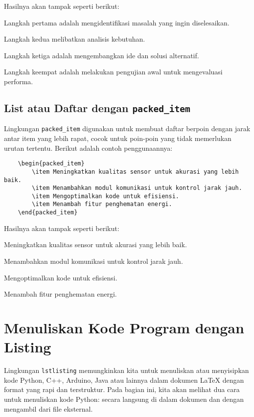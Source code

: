 Hasilnya akan tampak seperti berikut:
\begin{packed_enum}
    \item Langkah pertama adalah mengidentifikasi masalah yang ingin diselesaikan.
    \item Langkah kedua melibatkan analisis kebutuhan.
    \item Langkah ketiga adalah mengembangkan ide dan solusi alternatif.
    \item Langkah keempat adalah melakukan pengujian awal untuk mengevaluasi performa.
\end{packed_enum}

\subsection{List atau Daftar dengan \texttt{packed\_item}}
Lingkungan \texttt{packed\_item} digunakan untuk membuat daftar berpoin dengan jarak antar item yang lebih rapat, cocok untuk poin-poin yang tidak memerlukan urutan tertentu. Berikut adalah contoh penggunaannya:

\begin{lstlisting}
    \begin{packed_item}
        \item Meningkatkan kualitas sensor untuk akurasi yang lebih baik.
        \item Menambahkan modul komunikasi untuk kontrol jarak jauh.
        \item Mengoptimalkan kode untuk efisiensi.
        \item Menambah fitur penghematan energi.
    \end{packed_item}
\end{lstlisting}

Hasilnya akan tampak seperti berikut:
\begin{packed_item}
    \item Meningkatkan kualitas sensor untuk akurasi yang lebih baik.
    \item Menambahkan modul komunikasi untuk kontrol jarak jauh.
    \item Mengoptimalkan kode untuk efisiensi.
    \item Menambah fitur penghematan energi.
\end{packed_item}

\section{Menuliskan Kode Program dengan Listing}
Lingkungan \texttt{lstlisting} memungkinkan kita untuk menuliskan atau menyisipkan kode Python, C++, Arduino, Java atau lainnya dalam dokumen LaTeX dengan format yang rapi dan terstruktur. Pada bagian ini, kita akan melihat dua cara untuk menuliskan kode Python: secara langsung di dalam dokumen dan dengan mengambil dari file eksternal.


